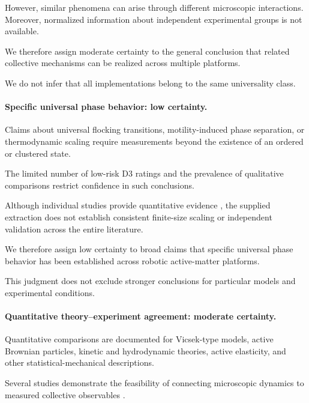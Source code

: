 However, similar phenomena
can arise through different
microscopic interactions.
Moreover, normalized
information about independent
experimental groups is
not available.

We therefore assign
moderate certainty to
the general conclusion
that related collective
mechanisms can be
realized across
multiple platforms.

We do not infer
that all implementations
belong to the same
universality class.

\paragraph*{Specific universal phase behavior:
low certainty.}

Claims about universal flocking transitions,
motility-induced phase separation,
or thermodynamic scaling require
measurements beyond the existence
of an ordered or clustered state.

The limited number of
low-risk D3 ratings
and the prevalence
of qualitative comparisons
restrict confidence
in such conclusions.

Although individual studies
provide quantitative evidence
\cite{Tarcai2011patternstransition,Buerle2020formationofstable,Xiao2023perceptionofmotion,Barone2024experimentalandnum,Wang2025hyperuniformnetwork,Verdoucq2025flockingphasetrans},
the supplied extraction
does not establish
consistent finite-size
scaling or independent
validation across
the entire literature.

We therefore assign
low certainty to
broad claims that
specific universal
phase behavior
has been established
across robotic
active-matter
platforms.

This judgment does
not exclude stronger
conclusions for
particular models
and experimental
conditions.

\paragraph*{Quantitative theory--experiment agreement:
moderate certainty.}

Quantitative comparisons are documented
for Vicsek-type models,
active Brownian particles,
kinetic and hydrodynamic theories,
active elasticity,
and other statistical-mechanical
descriptions.

Several studies demonstrate
the feasibility of connecting
microscopic dynamics to
measured collective observables
\cite{Buerle2020formationofstable,Chvykov2020lowrattlingapred,Brandenbourger2021limitcyclesturnac,Xiao2023perceptionofmotion,Barone2024experimentalandnum,Heuthe2025tunablecolloidalsw,Boudet2025nonmarkoviandynami,Hanson2025electrokineticpropu,Zion2023morphologicalcomput}.

